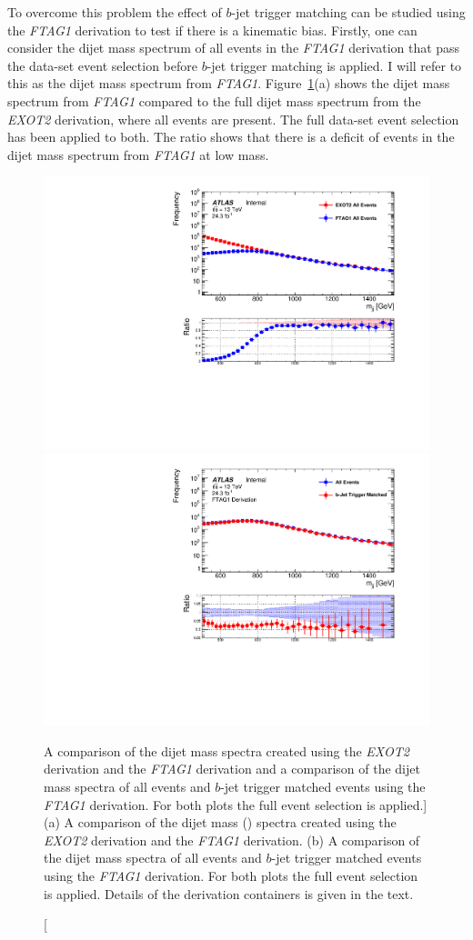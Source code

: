 To overcome this problem the effect of $b$-jet trigger matching can be studied using the \textit{FTAG1} derivation
to test if there is a kinematic bias.
Firstly, one can consider the dijet mass spectrum of all events in the \textit{FTAG1} derivation
that pass the \lm{} data-set event selection before $b$-jet trigger matching is applied.
I will refer to this as the dijet mass spectrum from \textit{FTAG1}.
Figure~\ref{fig:evt-btrig_match}(a) shows the dijet mass spectrum from \textit{FTAG1}
compared to the full dijet mass spectrum from the \textit{EXOT2} derivation, where all events are present.
The full \lm{} data-set event selection has been applied to both.
The ratio shows that there is a deficit of events in the dijet mass spectrum from \textit{FTAG1} at low mass.

\begin{figure}[!ht]
  \begin{center}
    \captionsetup[subfigure]{aboveskip=0pt,justification=centering}
    \subcaptionbox{} {\includegraphics[width=0.5\linewidth, angle=0]{figs/Dibjet/LowMass/evt-trigmatch_exot2.pdf} }\hspace{-5mm}
    \subcaptionbox{} {\includegraphics[width=0.5\linewidth, angle=0]{figs/Dibjet/LowMass/evt-trigmatch_ftag1.pdf} }
  \end{center}
  \vspace{-1em}
  \caption
      [A comparison of the dijet mass spectra created using the \textit{EXOT2} derivation and the \textit{FTAG1} derivation
       and a comparison of the dijet mass spectra of all events and $b$-jet trigger matched events using the \textit{FTAG1} derivation.
        For both plots the full \lm{} event selection is applied.]
      {(a) A comparison of the dijet mass (\mjj) spectra created using the \textit{EXOT2} derivation and the \textit{FTAG1} derivation.
        (b) A comparison of the dijet mass spectra of all events and $b$-jet trigger matched events using the \textit{FTAG1} derivation.
        For both plots the full \lm{} event selection is applied. Details of the derivation containers is given in the text. }
      \label{fig:evt-btrig_match}
\end{figure}

